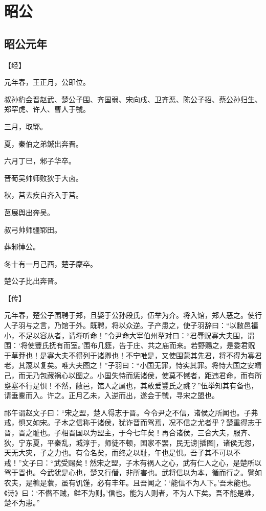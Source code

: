 \documentclass[a4paper,12pt,UTF8,twoside]{ctexbook}
\begin{document}
\part{昭公}

\chapter{昭公元年}



【经】

元年春，王正月，公即位。

叔孙豹会晋赵武、楚公子围、齐国弱、宋向戌、卫齐恶、陈公子招、蔡公孙归生、郑罕虎、许人、曹人于虢。

三月，取郓。

夏，秦伯之弟鍼出奔晋。

六月丁巳，邾子华卒。

晋荀吴帅师败狄于大卤。

秋，莒去疾自齐入于莒。

莒展舆出奔吴。

叔弓帅师疆郓田。

葬邾悼公。

冬十有一月己酉，楚子麇卒。

楚公子比出奔晋。

【传】

元年春，楚公子围聘于郑，且娶于公孙段氏，伍举为介。将入馆，郑人恶之。使行人子羽与之言，乃馆于外。既聘，将以众逆。子产患之，使子羽辞曰：“以敝邑褊小，不足以容从者，请墠听命！”令尹命大宰伯州犁对曰：“君辱贶寡大夫围，谓围：‘将使豐氏抚有而室。’围布几筵，告于庄、共之庙而来。若野赐之，是委君贶于草莽也！是寡大夫不得列于诸卿也！不宁唯是，又使围蒙其先君，将不得为寡君老，其蔑以复矣。唯大夫图之！”子羽曰：“小国无罪，恃实其罪。将恃大国之安靖己，而无乃包藏祸心以图之。小国失恃而惩诸侯，使莫不憾者，距违君命，而有所壅塞不行是惧！不然，敝邑，馆人之属也，其敢爱豐氏之祧？”伍举知其有备也，请垂櫜而入。许之。正月乙未，入逆而出，遂会于虢，寻宋之盟也。

祁午谓赵文子曰：“宋之盟，楚人得志于晋。今令尹之不信，诸侯之所闻也。子弗戒，惧又如宋。子木之信称于诸侯，犹诈晋而驾焉，况不信之尤者乎？楚重得志于晋，晋之耻也。子相晋国以为盟主，于今七年矣！再合诸侯，三合大夫，服齐、狄，宁东夏，平秦乱，城淳于，师徒不顿，国家不罢，民无谤[插图]，诸侯无怨，天无大灾，子之力也。有令名矣，而终之以耻，午也是惧。吾子其不可以不戒！”文子曰：“武受赐矣！然宋之盟，子木有祸人之心，武有仁人之心，是楚所以驾于晋也。今武犹是心也，楚又行僭，非所害也。武将信以为本，循而行之。譬如农夫，是穮是蓘，虽有饥馑，必有丰年。且吾闻之：‘能信不为人下。’吾未能也。《诗》曰：‘不僭不贼，鲜不为则。’信也。能为人则者，不为人下矣。吾不能是难，楚不为患。”
\end{document}
